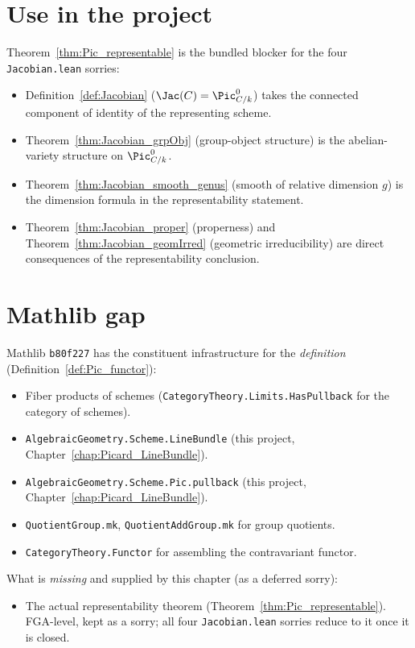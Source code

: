 \section{Use in the project}

Theorem~\ref{thm:Pic_representable} is the bundled blocker for the four \lstinline{Jacobian.lean} sorries:

\begin{itemize}
  \item Definition~\ref{def:Jacobian} ($\Jac(C) = \Pic^0_{C/k}$) takes the connected component of identity of the representing scheme.
  \item Theorem~\ref{thm:Jacobian_grpObj} (group-object structure) is the abelian-variety structure on $\Pic^0_{C/k}$.
  \item Theorem~\ref{thm:Jacobian_smooth_genus} (smooth of relative dimension $g$) is the dimension formula in the representability statement.
  \item Theorem~\ref{thm:Jacobian_proper} (properness) and Theorem~\ref{thm:Jacobian_geomIrred} (geometric irreducibility) are direct consequences of the representability conclusion.
\end{itemize}

\section{Mathlib gap}

Mathlib \texttt{b80f227} has the constituent infrastructure for the \emph{definition} (Definition~\ref{def:Pic_functor}):
\begin{itemize}
  \item Fiber products of schemes (\lstinline{CategoryTheory.Limits.HasPullback} for the category of schemes).
  \item \lstinline{AlgebraicGeometry.Scheme.LineBundle} (this project, Chapter~\ref{chap:Picard_LineBundle}).
  \item \lstinline{AlgebraicGeometry.Scheme.Pic.pullback} (this project, Chapter~\ref{chap:Picard_LineBundle}).
  \item \lstinline{QuotientGroup.mk}, \lstinline{QuotientAddGroup.mk} for group quotients.
  \item \lstinline{CategoryTheory.Functor} for assembling the contravariant functor.
\end{itemize}

What is \emph{missing} and supplied by this chapter (as a deferred sorry):
\begin{itemize}
  \item The actual representability theorem (Theorem~\ref{thm:Pic_representable}). FGA-level, kept as a sorry; all four \lstinline{Jacobian.lean} sorries reduce to it once it is closed.
\end{itemize}

